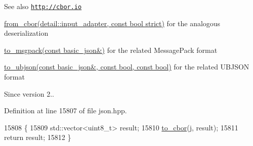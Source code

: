 \begin{DoxySeeAlso}{See also}
\href{http://cbor.io}{\tt http\+://cbor.\+io} 

\hyperlink{classnlohmann_1_1basic__json_aa9be366b887378bb10c0f1ab510c2f0c}{from\+\_\+cbor(detail\+::input\+\_\+adapter, const bool strict)} for the analogous deserialization 

\hyperlink{classnlohmann_1_1basic__json_a09ca1dc273d226afe0ca83a9d7438d9c}{to\+\_\+msgpack(const basic\+\_\+json\&)} for the related Message\+Pack format 

\hyperlink{classnlohmann_1_1basic__json_ae1ece6c2059114eac10873f13ef19185}{to\+\_\+ubjson(const basic\+\_\+json\&, const bool, const bool)} for the related U\+B\+J\+S\+ON format
\end{DoxySeeAlso}
\begin{DoxySince}{Since}
version 2.. 
\end{DoxySince}


Definition at line 15807 of file json.\+hpp.


\begin{DoxyCode}
15808     \{
15809         std::vector<uint8\_t> result;
15810         \hyperlink{classnlohmann_1_1basic__json_a2566783e190dec524bf3445b322873b8}{to\_cbor}(j, result);
15811         \textcolor{keywordflow}{return} result;
15812     \}
\end{DoxyCode}
\mbox{\label{classnlohmann_1_1basic__json_a5d9a89ac7ed08171a22dc6d65d033c09}} 

